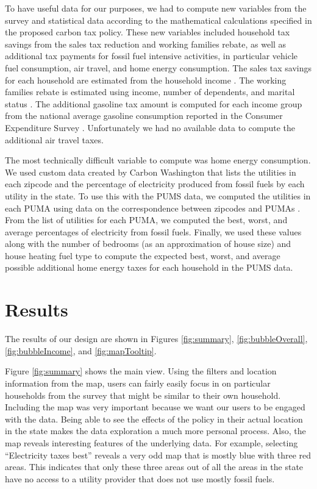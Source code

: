 \documentclass{sigchi}
\begin{document}
To have useful data for our purposes, we had to compute new variables from the survey and statistical data according to the mathematical calculations specified in the proposed carbon tax policy. These new variables included household tax savings from the sales tax reduction and working families rebate, as well as additional tax payments for fossil fuel intensive activities, in particular vehicle fuel consumption, air travel, and home energy consumption. The sales tax savings for each household are estimated from the household income \cite{salesTax}. The working families rebate is estimated using income, number of dependents, and marital status \cite{eitc}. The additional gasoline tax amount is computed for each income group from the national average gasoline consumption reported in the Consumer Expenditure Survey \cite{ces}. Unfortunately we had no available data to compute the additional air travel taxes. 

The most technically difficult variable to compute was home energy consumption. We used custom data created by Carbon Washington that lists the utilities in each zipcode and the percentage of electricity produced from fossil fuels by each utility in the state. To use this with the PUMS data, we computed the utilities in each PUMA using data on the correspondence between zipcodes and PUMAs \cite{missouri}. From the list of utilities for each PUMA, we computed the best, worst, and average percentages of electricity from fossil fuels. Finally, we used these values along with the number of bedrooms (as an approximation of house size) and house heating fuel type to compute the expected best, worst, and average possible additional home energy taxes for each household in the PUMS data. 


\section{Results}
The results of our design are shown in Figures \ref{fig:summary}, \ref{fig:bubbleOverall}, \ref{fig:bubbleIncome}, and \ref{fig:mapTooltip}. 

Figure \ref{fig:summary} shows the main view. Using the filters and location information from the map, users can fairly easily focus in on particular households from the survey that might be similar to their own household. Including the map was very important because we want our users to be engaged with the data. Being able to see the effects of the policy in their actual location in the state makes the data exploration a much more personal process. Also, the map reveals interesting features of the underlying data. For example, selecting ``Electricity taxes best'' reveals a very odd map that is mostly blue with three red areas. This indicates that only these three areas out of all the areas in the state have no access to a utility provider that does not use mostly fossil fuels. 
\end{document}
